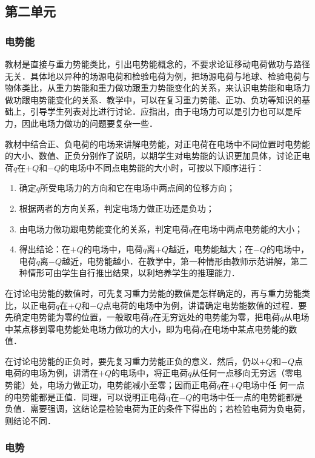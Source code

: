 \subsection{第二单元}
\subsubsection{电势能}

教材是直接与重力势能类比，引出电势能概念的，不要求论证移动电荷做功与路径无关．具体地以异种的场源电荷和检验电荷为例，把场源电荷与地球、检验电荷与物体类比，从重力势能和重力做功跟重力势能变化的关系，来认识电势能和电场力做功跟电势能变化的关系．教学中，可以在复习重力势能、正功、负功等知识的基础上，引导学生列表对比进行讨论．应指出，由于电场力可以是引力也可以是斥力，因此电场力做功的问题要复杂一些．

教材中结合正、负电荷的电场来讲解电势能，对正电荷在电场中不同位置时电势能的大小、数值、正负分别作了说明，以期学生对电势能的认识更加具体，讨论正电荷$q$在$+Q$和$-Q$的电场中不同点电势能的大小时，可按以下顺序进行：
\begin{enumerate}
\item 确定$q$所受电场力的方向和它在电场中两点间的位移方向；    \item 根据两者的方向关系，判定电场力做正功还是负功；    \item 由电场力做功跟电势能变化的关系，判定电荷$q$在电场中两点电势能的大小；    \item 得出结论：在$+Q$的电场中，电荷$q$离$+Q$越近，电势能越大；在$-Q$的电场中，电荷$q$离$-Q$越近，电势能越小．在教学中，第一种情形由教师示范讲解，第二种情形可由学生自行推出结果，以利培养学生的推理能力．
\end{enumerate}

在讨论电势能的数值时，可先复习重力势能的数值是怎样确定的，再与重力势能类比，以正电荷$q$在$+Q$和$-Q$点电荷的电场中为例，讲请确定电势能数值的过程．要先确定电势能为零的位置，一般取电荷$q$在无穷远处的电势能为零，把电荷$q$从电场中某点移到零电势能处电场力做功的大小，即为电荷$q$在电场中某点电势能的数值．

在讨论电势能的正负时，要先复习重力势能正负的意义．然后，仍以$+Q$和$-Q$点电荷的电场为例，讲清在$+Q$的电场中，将正电荷$q$从任何一点移向无穷远（零电势能）处，电场力做正功，电势能减小至零；因而正电荷$q$在$+Q$电场中任
何一点的电势能都是正值．同理，可以说明正电荷q在$-Q$的电场中任一点的电势能都是负值．需要强调，这结论是检验电荷为正的条件下得出的；若检验电荷为负电荷，则结论不同．

\subsubsection{电势}

